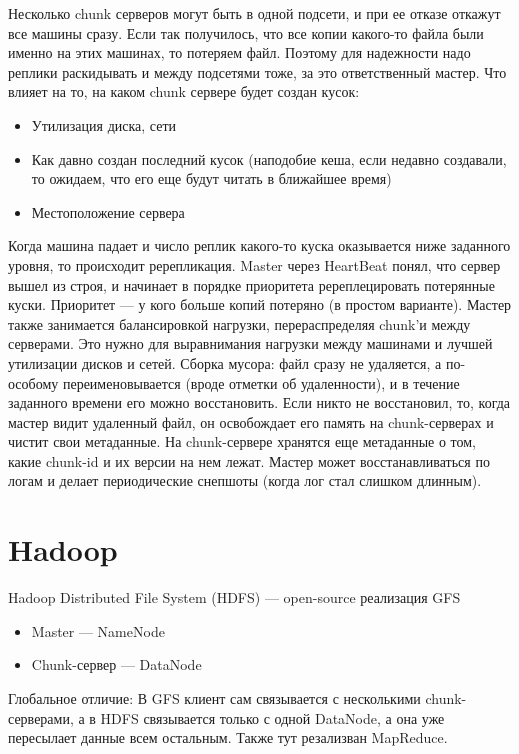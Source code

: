     \quad Несколько chunk серверов могут быть в одной подсети, и при ее отказе откажут все машины сразу. Если так получилось, что все копии какого-то файла были именно на этих машинах, то потеряем файл. Поэтому для надежности надо реплики раскидывать и между подсетями тоже, за это ответственный мастер. Что влияет на то, на каком chunk сервере будет создан кусок:
    \begin{itemize}
        \item Утилизация диска, сети
        \item Как давно создан последний кусок (наподобие кеша, если недавно создавали, то ожидаем, что его еще будут читать в ближайшее время)
        \item Местоположение сервера
    \end{itemize}
    
    \quad Когда машина падает и число реплик какого-то куска оказывается ниже заданного уровня, то происходит ререпликация. Master через HeartBeat понял, что сервер вышел из строя, и начинает в порядке приоритета ререплецировать потерянные куски. Приоритет --- у кого больше копий потеряно (в простом варианте). Мастер также занимается балансировкой нагрузки, перераспределяя chunk'и между серверами. Это нужно для выравнимания нагрузки между машинами и лучшей утилизации дисков и сетей. Сборка мусора: файл сразу не удаляется, а по-особому переименовывается (вроде отметки об удаленности), и в течение заданного времени его можно восстановить. Если никто не восстановил, то, когда мастер видит удаленный файл, он освобождает его память на chunk-серверах и чистит свои метаданные. На chunk-сервере хранятся еще метаданные о том, какие chunk-id и их версии на нем лежат. Мастер может восстанавливаться по логам и делает периодические снепшоты (когда лог стал слишком длинным).

\section{Hadoop}
    \quad Hadoop Distributed File System (HDFS) --- open-source реализация GFS
    \begin{itemize}
        \item Master --- NameNode
        \item Chunk-сервер --- DataNode
    \end{itemize}
    \quad Глобальное отличие: В GFS клиент сам связывается с несколькими chunk-серверами, а в HDFS связывается только с одной DataNode, а она уже пересылает данные всем остальным. Также тут резализван MapReduce.

